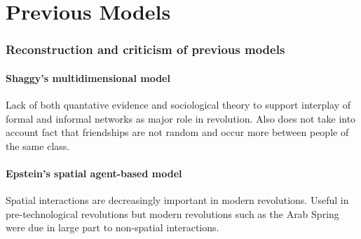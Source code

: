 \chapter{Previous Models}
\subsection{Reconstruction and criticism of previous models}
\subsubsection{Shaggy's multidimensional model}
Lack of both quantative evidence and sociological theory to support interplay of formal and informal networks as major role in revolution. Also does not take into account fact that friendships are not random and occur more between people of the same class.\\
\subsubsection{Epstein's spatial agent-based model}
Spatial interactions are decreasingly important in modern revolutions. Useful in pre-technological revolutions but modern revolutions such as the Arab Spring were due in large part to non-spatial interactions.